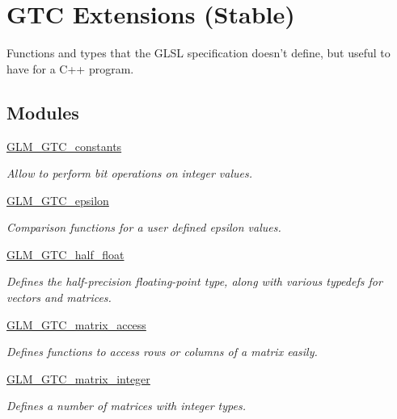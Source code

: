 \hypertarget{group__gtc}{\section{G\-T\-C Extensions (Stable)}
\label{group__gtc}
}


Functions and types that the G\-L\-S\-L specification doesn't define, but useful to have for a C++ program.  


\subsection*{Modules}
\begin{DoxyCompactItemize}
\item 
\hyperlink{group__gtc__constants}{G\-L\-M\-\_\-\-G\-T\-C\-\_\-constants}
\begin{DoxyCompactList}\small\item\em Allow to perform bit operations on integer values. \end{DoxyCompactList}\item 
\hyperlink{group__gtc__epsilon}{G\-L\-M\-\_\-\-G\-T\-C\-\_\-epsilon}
\begin{DoxyCompactList}\small\item\em Comparison functions for a user defined epsilon values. \end{DoxyCompactList}\item 
\hyperlink{group__gtc__half__float}{G\-L\-M\-\_\-\-G\-T\-C\-\_\-half\-\_\-float}
\begin{DoxyCompactList}\small\item\em Defines the half-\/precision floating-\/point type, along with various typedefs for vectors and matrices. \end{DoxyCompactList}\item 
\hyperlink{group__gtc__matrix__access}{G\-L\-M\-\_\-\-G\-T\-C\-\_\-matrix\-\_\-access}
\begin{DoxyCompactList}\small\item\em Defines functions to access rows or columns of a matrix easily. \end{DoxyCompactList}\item 
\hyperlink{group__gtc__matrix__integer}{G\-L\-M\-\_\-\-G\-T\-C\-\_\-matrix\-\_\-integer}
\begin{DoxyCompactList}\small\item\em Defines a number of matrices with integer types. \end{DoxyCompactList}\item 

\end{DoxyCompactItemize}
